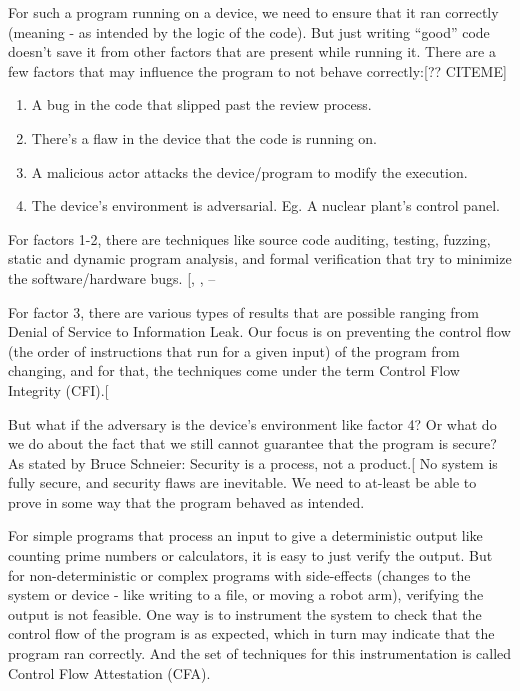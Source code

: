 \documentclass[a4paper, nobind]{templates/ociamthesis}
\providecommand{\tightlist}{%
  \setlength{\itemsep}{0pt}\setlength{\parskip}{0pt}}
\begin{document}
For such a program running on a device, we need to ensure that it ran correctly
(meaning - as intended by the logic of the code).
But just writing ``good'' code doesn't save it from other factors that are present while running it.
There are a few factors that may influence the program to not behave correctly:{[}?? CITEME{]}

\begin{enumerate}
\def\labelenumi{\arabic{enumi}.}
\tightlist
\item
  A bug in the code that slipped past the review process.
\item
  There's a flaw in the device that the code is running on.
\item
  A malicious actor attacks the device/program to modify the execution.
\item
  The device's environment is adversarial. Eg. A nuclear plant's control panel.
\end{enumerate}

For factors 1-2, there are techniques like source code auditing, testing,
fuzzing, static and dynamic program analysis, and formal verification that try to minimize the software/hardware bugs.
{[}, , --\citeproc{ref-quinlan2009source}{22}{]}

For factor 3, there are various types of results that are possible ranging from
Denial of Service to Information Leak.
Our focus is on preventing the control flow (the order of instructions that run for a given input)
of the program from changing, and for that, the techniques come under the term
Control Flow Integrity (CFI).{[}\citeproc{ref-sok}{2}{]}

But what if the adversary is the device's environment like factor 4?
Or what do we do about the fact that we still cannot guarantee that the program is secure?
As stated by Bruce Schneier: Security is a process, not a product.{[}\citeproc{ref-bruceessay}{23}{]}
No system is fully secure, and security flaws are inevitable.
We need to at-least be able to prove in some way that the program behaved as intended.

For simple programs that process an input to give a deterministic output like
counting prime numbers or calculators, it is easy to just verify the output.
But for non-deterministic or complex programs with side-effects (changes to the
system or device - like writing to a file, or moving a robot arm), verifying the
output is not feasible. One way is to instrument the system to check that the
control flow of the program is as expected, which in turn may indicate
that the program ran correctly.
And the set of techniques for this instrumentation is called Control Flow
Attestation (CFA).
\end{document}
